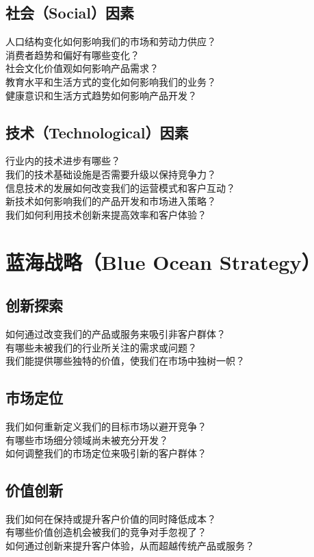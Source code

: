 \documentclass[12pt]{book}
\begin{document}
\subsection{社会（Social）因素}
人口结构变化如何影响我们的市场和劳动力供应？\\
消费者趋势和偏好有哪些变化？\\
社会文化价值观如何影响产品需求？\\
教育水平和生活方式的变化如何影响我们的业务？\\
健康意识和生活方式趋势如何影响产品开发？\\

\subsection{技术（Technological）因素}
行业内的技术进步有哪些？\\
我们的技术基础设施是否需要升级以保持竞争力？\\
信息技术的发展如何改变我们的运营模式和客户互动？\\
新技术如何影响我们的产品开发和市场进入策略？\\
我们如何利用技术创新来提高效率和客户体验？\\


\section{蓝海战略（Blue Ocean Strategy）}
\subsection{创新探索}
如何通过改变我们的产品或服务来吸引非客户群体？\\
有哪些未被我们的行业所关注的需求或问题？\\
我们能提供哪些独特的价值，使我们在市场中独树一帜？\\

\subsection{市场定位}
我们如何重新定义我们的目标市场以避开竞争？\\
有哪些市场细分领域尚未被充分开发？\\
如何调整我们的市场定位来吸引新的客户群体？\\

\subsection{价值创新}
我们如何在保持或提升客户价值的同时降低成本？\\
有哪些价值创造机会被我们的竞争对手忽视了？\\
如何通过创新来提升客户体验，从而超越传统产品或服务？\\
\end{document}
